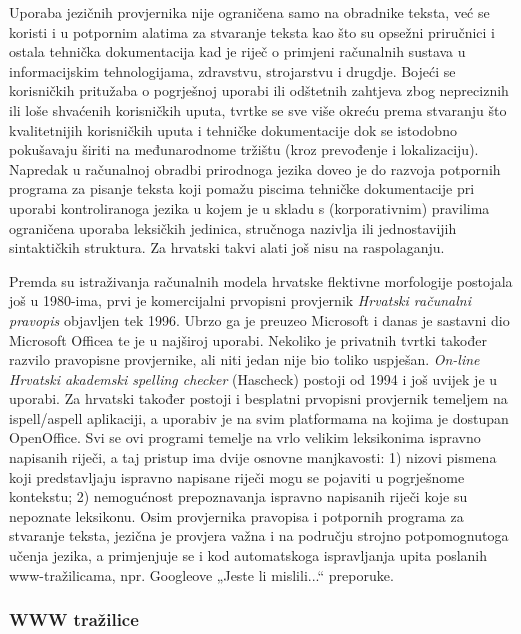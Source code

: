 \begin{multicols}{2}
Uporaba jezičnih provjernika nije ograničena samo na obradnike teksta, već se koristi i u potpornim alatima za stvaranje teksta kao što su opsežni priručnici i ostala tehnička dokumentacija kad je riječ o primjeni računalnih sustava u informacijskim tehnologijama, zdravstvu, strojarstvu i drugdje. Bojeći se korisničkih pritužaba o pogrješnoj uporabi ili odštetnih zahtjeva zbog nepreciznih ili loše shvaćenih korisničkih uputa, tvrtke se sve više okreću prema stvaranju što kvalitetnijih korisničkih uputa i tehničke dokumentacije dok se istodobno pokušavaju širiti na međunarodnome tržištu (kroz prevođenje i lokalizaciju). Napredak u računalnoj obradbi prirodnoga jezika doveo je do razvoja potpornih programa za pisanje teksta koji pomažu piscima tehničke dokumentacije pri uporabi kontroliranoga jezika u kojem je u skladu s (korporativnim) pravilima ograničena uporaba leksičkih jedinica, stručnoga nazivlja ili jednostavijih sintaktičkih struktura. Za hrvatski takvi alati još nisu na raspolaganju.


Premda su istraživanja računalnih modela hrvatske flektivne morfologije postojala još u 1980-ima, prvi je komercijalni prvopisni provjernik \emph{Hrvatski računalni pravopis} objavljen tek 1996. \cite{boo2} Ubrzo ga je preuzeo Microsoft i danas je sastavni dio Microsoft Officea te je u najširoj uporabi. Nekoliko je privatnih tvrtki također razvilo pravopisne provjernike, ali niti jedan nije bio toliko uspješan. \emph{On-line Hrvatski akademski spelling checker} (Hascheck) \cite{str13} postoji od 1994 i još uvijek je u uporabi. Za hrvatski također postoji i besplatni prvopisni provjernik temeljem na ispell/aspell aplikaciji, a uporabiv je na svim platformama na kojima je dostupan OpenOffice. Svi se ovi programi temelje na vrlo velikim leksikonima ispravno napisanih riječi, a taj pristup ima dvije osnovne manjkavosti: 1) nizovi pismena koji predstavljaju ispravno napisane riječi mogu se pojaviti u pogrješnome kontekstu; 2) nemogućnost prepoznavanja ispravno napisanih riječi koje su nepoznate leksikonu. Osim provjernika pravopisa i potpornih programa za stvaranje teksta, jezična je provjera važna i na području strojno potpomognutoga učenja jezika, a primjenjuje se i kod automatskoga ispravljanja upita poslanih www-tražilicama, npr. Googleove „Jeste li mislili...“ preporuke. 

\subsubsection{WWW tražilice}


\end{multicols}
